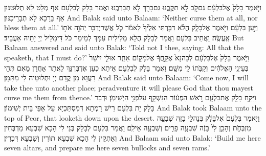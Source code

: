 {וַיֹּ֤אמֶר בָּלָק֙ אֶל\maqqaf בִּלְעָ֔ם גַּם\maqqaf קֹ֖ב לֹ֣א תִקֳּבֶ֑נּוּ גַּם\maqqaf בָּרֵ֖ךְ לֹ֥א תְבָרְכֶֽנּוּ׃}
{וַאֲמַר בָּלָק לְבִלְעָם אַף מְלָט לָא תְלוּטִנּוּן אַף בָּרָכָא לָא תְבָרֵיכִנּוּן׃}
{And Balak said unto Balaam: ‘Neither curse them at all, nor bless them at all.’}{}
{וַיַּ֣עַן בִּלְעָ֔ם וַיֹּ֖אמֶר אֶל\maqqaf בָּלָ֑ק הֲלֹ֗א דִּבַּ֤רְתִּי אֵלֶ֙יךָ֙ לֵאמֹ֔ר כֹּ֛ל אֲשֶׁר\maqqaf יְדַבֵּ֥ר יְהֹוָ֖ה אֹת֥וֹ אֶֽעֱשֶֽׂה׃}
{וַאֲתֵיב בִּלְעָם וַאֲמַר לְבָלָק הֲלָא מַלֵּילִית עִמָּךְ לְמֵימַר כֹּל דִּימַלֵּיל יְיָ יָתֵיהּ אַעֲבֵיד׃}
{But Balaam answered and said unto Balak: ‘Told not I thee, saying: All that the \lord\space speaketh, that I must do?’}{}
{וַיֹּ֤אמֶר בָּלָק֙ אֶל\maqqaf בִּלְעָ֔ם לְכָה\maqqaf נָּא֙ אֶקָּ֣חֲךָ֔ אֶל\maqqaf מָק֖וֹם אַחֵ֑ר אוּלַ֤י יִישַׁר֙ בְּעֵינֵ֣י הָאֱלֹהִ֔ים וְקַבֹּ֥תוֹ לִ֖י מִשָּֽׁם׃}
{וַאֲמַר בָּלָק לְבִלְעָם אֵיתַא כְעַן אֶדְבְּרִנָּךְ לַאֲתַר אָחֳרָן מָאִם תְּהֵי רַעֲוָא מִן קֳדָם יְיָ וּתְלוּטֵיהּ לִי מִתַּמָּן׃}
{And Balak said unto Balaam: ‘Come now, I will take thee unto another place; peradventure it will please God that thou mayest curse me them from thence.’}{}
{וַיִּקַּ֥ח בָּלָ֖ק אֶת\maqqaf בִּלְעָ֑ם רֹ֣אשׁ הַפְּע֔וֹר הַנִּשְׁקָ֖ף עַל\maqqaf פְּנֵ֥י הַיְשִׁימֹֽן׃}
{וּדְבַר בָּלָק יָת בִּלְעָם רֵישׁ רָמְתָא דְּמִסְתַּכְיָא עַל אַפֵּי בֵּית יְשִׁימוֹן׃}
{And Balak took Balaam unto the top of Peor, that looketh down upon the desert.}{}
{וַיֹּ֤אמֶר בִּלְעָם֙ אֶל\maqqaf בָּלָ֔ק בְּנֵה\maqqaf לִ֥י בָזֶ֖ה שִׁבְעָ֣ה מִזְבְּחֹ֑ת וְהָכֵ֥ן לִי֙ בָּזֶ֔ה שִׁבְעָ֥ה פָרִ֖ים וְשִׁבְעָ֥ה אֵילִֽם׃}
{וַאֲמַר בִּלְעָם לְבָלָק בְּנֵי לִי הָכָא שִׁבְעָא מַדְבְּחִין וְאַתְקֵין לִי הָכָא שִׁבְעָא תוֹרִין וְשִׁבְעָא דִּכְרִין׃}
{And Balaam said unto Balak: ‘Build me here seven altars, and prepare me here seven bullocks and seven rams.’}{}

